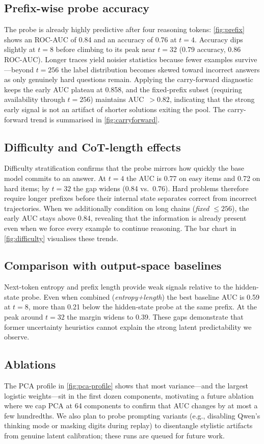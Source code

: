 \documentclass[10pt,a4paper,twocolumn]{article}
\begin{document}
\subsection{Prefix-wise probe accuracy}
The probe is already highly predictive after four reasoning tokens: \cref{fig:prefix} shows an ROC-AUC of 0.84 and an accuracy of 0.76 at $t{=}4$.  Accuracy dips slightly at $t{=}8$ before climbing to its peak near $t{=}32$ (0.79 accuracy, 0.86 ROC-AUC).  Longer traces yield noisier statistics because fewer examples survive---beyond $t{=}256$ the label distribution becomes skewed toward incorrect answers as only genuinely hard questions remain.  Applying the carry-forward diagnostic keeps the early AUC plateau at 0.858, and the fixed-prefix subset (requiring availability through $t{=}256$) maintains AUC~$>0.82$, indicating that the strong early signal is not an artifact of shorter solutions exiting the pool.  The carry-forward trend is summarised in \cref{fig:carryforward}.


\subsection{Difficulty and CoT-length effects}
Difficulty stratification confirms that the probe mirrors how quickly the base model commits to an answer.  At $t{=}4$ the AUC is 0.77 on easy items and 0.72 on hard items; by $t{=}32$ the gap widens (0.84 vs.\ 0.76).  Hard problems therefore require longer prefixes before their internal state separates correct from incorrect trajectories.  When we additionally condition on long chains (\textit{fixed $\leq\!256$}), the early AUC stays above 0.84, revealing that the information is already present even when we force every example to continue reasoning.  The bar chart in \cref{fig:difficulty} visualises these trends.

\subsection{Comparison with output-space baselines}
Next-token entropy and prefix length provide weak signals relative to the hidden-state probe.  Even when combined (\textit{entropy+length}) the best baseline AUC is 0.59 at $t{=}8$, more than 0.21 below the hidden-state probe at the same prefix.  At the peak around $t{=}32$ the margin widens to 0.39.  These gaps demonstrate that former uncertainty heuristics cannot explain the strong latent predictability we observe.

\subsection{Ablations}
The PCA profile in \cref{fig:pca-profile} shows that most variance---and the largest logistic weights---sit in the first dozen components, motivating a future ablation where we cap PCA at 64 components to confirm that AUC changes by at most a few hundredths.  We also plan to probe prompting variants (e.g., disabling Qwen's thinking mode or masking digits during replay) to disentangle stylistic artifacts from genuine latent calibration; these runs are queued for future work.
\end{document}
